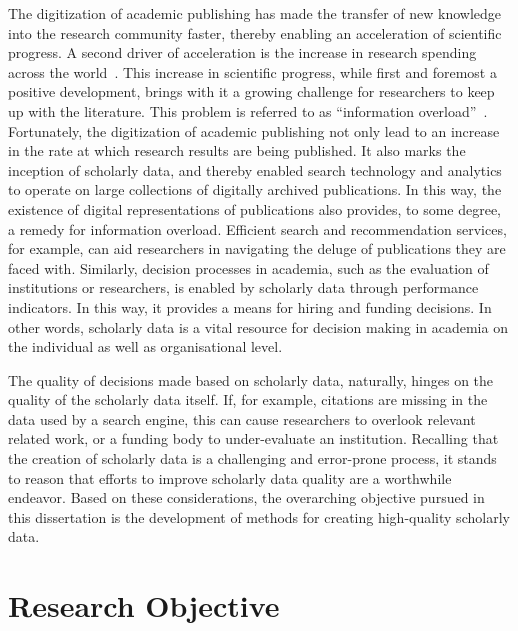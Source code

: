 The digitization of academic publishing has made the transfer of new knowledge into the research community faster, thereby enabling an acceleration of scientific progress. A second driver of acceleration is the increase in research spending across the world~\cite{CRS2022,OECD2023}.
This increase in scientific progress, while first and foremost a positive development, brings with it a growing challenge for researchers to keep up with the literature. This problem is referred to as ``information overload''~\cite{Landhuis2016}.
Fortunately, the digitization of academic publishing not only lead to %
an increase in the rate at which research results are being published. It also marks the inception of scholarly data, and thereby enabled search technology and analytics to operate on large collections of digitally archived publications.
In this way, the existence of digital representations of publications also provides, to some degree, a remedy for information overload. Efficient search and recommendation services, for example, can aid researchers in navigating the deluge of publications they are faced with.
Similarly, decision processes in academia, such as the evaluation of institutions or researchers, is enabled by scholarly data through performance indicators. In this way, it provides a means for hiring and funding decisions.
In other words, scholarly data is a vital resource for decision making in academia on the individual as well as organisational level.

The quality of decisions made based on scholarly data, naturally, hinges on the quality of the scholarly data itself. If, for example, citations are missing in the data used by a search engine, this can cause researchers to overlook relevant related work, or a funding body to under-evaluate an institution. Recalling that the creation of scholarly data is a challenging and error-prone process, it stands to reason that efforts to improve scholarly data quality are a worthwhile endeavor. Based on these considerations, the overarching objective pursued in this dissertation is the development of methods for creating high-quality scholarly data.


\section{Research Objective}\label{sec:intro-researchobj}

